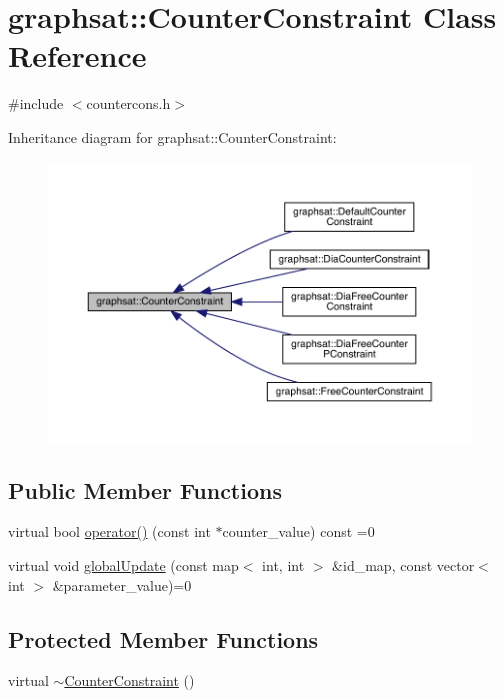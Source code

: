 \hypertarget{classgraphsat_1_1_counter_constraint}{}\section{graphsat\+::Counter\+Constraint Class Reference}
\label{classgraphsat_1_1_counter_constraint}


{\ttfamily \#include $<$countercons.\+h$>$}



Inheritance diagram for graphsat\+::Counter\+Constraint\+:
\nopagebreak
\begin{figure}[H]
\begin{center}
\leavevmode
\includegraphics[width=350pt]{classgraphsat_1_1_counter_constraint__inherit__graph}
\end{center}
\end{figure}
\subsection*{Public Member Functions}
\begin{DoxyCompactItemize}
\item 
virtual bool \mbox{\hyperlink{classgraphsat_1_1_counter_constraint_a1fb82c50097b34656ef5ca319dd352da}{operator()}} (const int $\ast$counter\+\_\+value) const =0
\item 
virtual void \mbox{\hyperlink{classgraphsat_1_1_counter_constraint_aa467ff66b37a1cbc69f5eddb269aaa0d}{global\+Update}} (const map$<$ int, int $>$ \&id\+\_\+map, const vector$<$ int $>$ \&parameter\+\_\+value)=0
\end{DoxyCompactItemize}
\subsection*{Protected Member Functions}
\begin{DoxyCompactItemize}
\item 
virtual \mbox{\hyperlink{classgraphsat_1_1_counter_constraint_af84f6083e587b99f5af0fdaa36e62a56}{$\sim$\+Counter\+Constraint}} ()
\end{DoxyCompactItemize}
